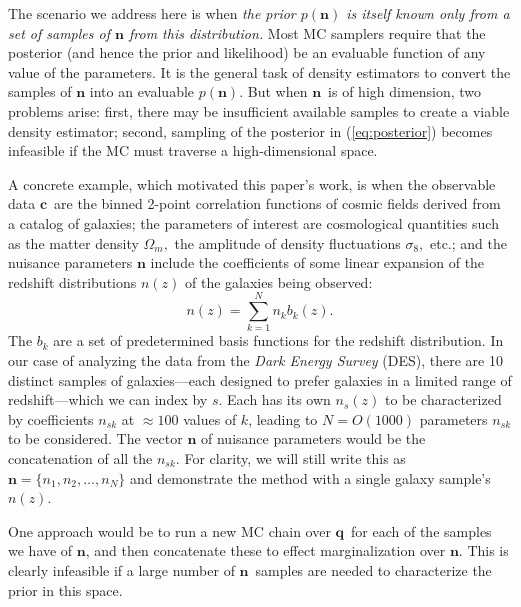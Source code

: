 \documentclass[linenumbers, onecolumn]{aastex7}
\newcommand{\vecc}{\ensuremath{\mathbf{c}}}
\newcommand{\vecq}{\ensuremath{\mathbf{q}}}
\newcommand{\vecn}{\ensuremath{\mathbf{n}}}
\begin{document}
The scenario we address here is when \emph{the prior $p(\vecn)$ is
  itself known only from a set of samples of $\vecn$ from this
  distribution.} Most MC samplers require that the posterior (and
hence the prior and likelihood) be an
evaluable function of any value of the parameters. It is the general task of density estimators to convert the samples of $\vecn$ into an evaluable $p(\vecn).$  But when \vecn\ is of high dimension, two problems arise: first, there may be insufficient available samples to create a viable density estimator; second, sampling of the posterior in (\ref{eq:posterior}) becomes infeasible if the MC must traverse a high-dimensional space.

A concrete example, which motivated this paper's work,
is when the observable data \vecc\ are the binned 2-point correlation functions of
cosmic fields derived from a catalog of galaxies; the parameters of
interest are cosmological quantities such as the  matter density
$\Omega_m,$ the amplitude of density fluctuations $\sigma_8,$
etc.; and the nuisance parameters $\vecn$
include the coefficients of some linear expansion of the redshift distributions $n(z)$ of the galaxies being observed:
\begin{equation}
  n(z) = \sum_{k=1}^{N} n_k b_k(z).
  \label{eq:nzbasis}
\end{equation}
The $b_k$ are a set of predetermined basis functions for the redshift
distribution.  In our case of analyzing the data from the  \textit{Dark Energy Survey} (DES), there are 10 distinct samples of galaxies---each designed to prefer galaxies in a limited range of redshift---which we can index by $s.$ Each has its own $n_s(z)$ to be characterized by coefficients $n_{sk}$ at $\approx100$ values of $k$, leading to $N=O(1000)$ parameters $n_{sk}$ to be considered.  The vector $\vecn$ of nuisance parameters would be the concatenation of all the $n_{sk}.$ For clarity, we will still write this as $\vecn=\{n_1,n_2,\ldots,n_N\}$ and demonstrate the method with a single galaxy sample's $n(z)$.

One approach would be to run a new MC chain over \vecq\ for each of the samples we have of \vecn, and then concatenate these to effect marginalization over \vecn.  This is clearly infeasible if a large number of \vecn\ samples are needed to characterize the prior in this space.
\end{document}
